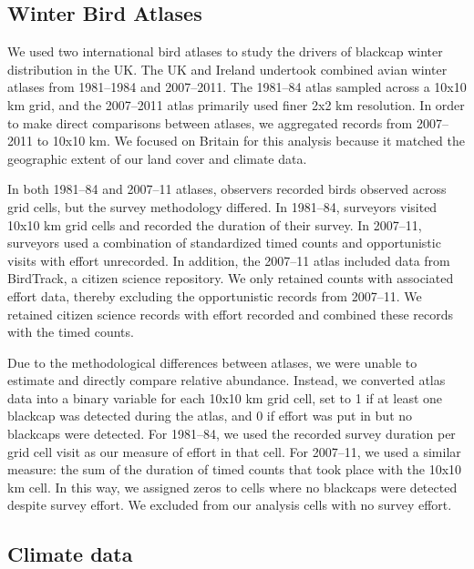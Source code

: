 \documentclass[a4paper, twoside]{templates/ociamthesis}
\begin{document}
\hypertarget{winter-bird-atlases}{%
\subsection{Winter Bird Atlases}\label{winter-bird-atlases}}

We used two international bird atlases to study the drivers of blackcap winter distribution in the UK. The UK and Ireland undertook combined avian winter atlases from 1981--1984 and 2007--2011. The 1981--84 atlas sampled across a 10x10 km grid, and the 2007--2011 atlas primarily used finer 2x2 km resolution. In order to make direct comparisons between atlases, we aggregated records from 2007--2011 to 10x10 km. We focused on Britain for this analysis because it matched the geographic extent of our land cover and climate data.

In both 1981--84 and 2007--11 atlases, observers recorded birds observed across grid cells, but the survey methodology differed. In 1981--84, surveyors visited 10x10 km grid cells and recorded the duration of their survey. In 2007--11, surveyors used a combination of standardized timed counts and opportunistic visits with effort unrecorded. In addition, the 2007--11 atlas included data from BirdTrack, a citizen science repository. We only retained counts with associated effort data, thereby excluding the opportunistic records from 2007--11. We retained citizen science records with effort recorded and combined these records with the timed counts.

Due to the methodological differences between atlases, we were unable to estimate and directly compare relative abundance. Instead, we converted atlas data into a binary variable for each 10x10 km grid cell, set to 1 if at least one blackcap was detected during the atlas, and 0 if effort was put in but no blackcaps were detected. For 1981--84, we used the recorded survey duration per grid cell visit as our measure of effort in that cell. For 2007--11, we used a similar measure: the sum of the duration of timed counts that took place with the 10x10 km cell. In this way, we assigned zeros to cells where no blackcaps were detected despite survey effort. We excluded from our analysis cells with no survey effort.

\hypertarget{climate-data}{%
\subsection{Climate data}\label{climate-data}}
\end{document}
